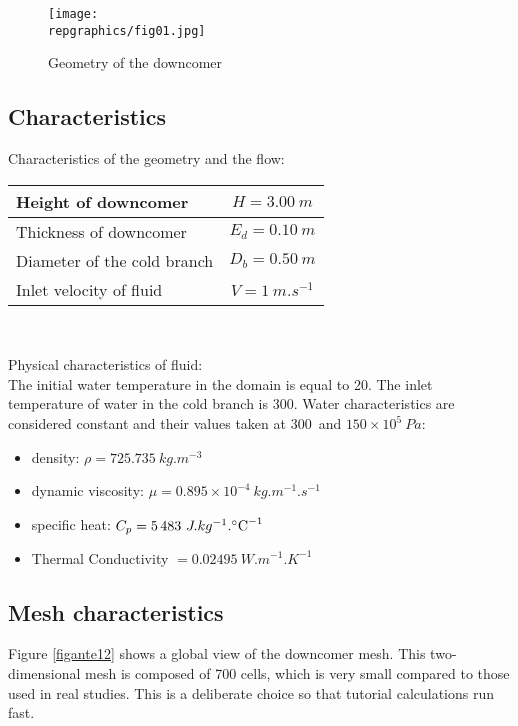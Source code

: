 \begin{figure}[h!]
\begin{center}
\texttt{[image: \\repgraphics/fig01.jpg]} 
\caption{Geometry of the downcomer}
\label{figante11}
\end{center}
\end{figure}

	\subsection{Characteristics}

Characteristics of the geometry and the flow:
\begin{center}
\begin{tabular}{|l|c|}
\hline
Height of downcomer & $H = 3.00\ m$ \\
\hline
Thickness of downcomer & $E_{d} = 0.10\ m$ \\
\hline
Diameter of the cold branch & $D_{b} = 0.50\ m$ \\
\hline
Inlet velocity of fluid & $V = 1\ m.s^{-1}$ \\
\hline
\end{tabular}\\
\end{center}

Physical characteristics of fluid:\\
The initial water temperature in the domain is equal to 20\degresC.
The inlet temperature of water in the cold branch is 300\degresC.
Water characteristics are considered constant and their values taken at
300\degresC\ and $150\times 10^{5}\ Pa$: 
\begin{itemize}
	\item density: $\rho = 725.735\ kg.m^{-3}$ 
	\item dynamic viscosity: $\mu = 0.895\times10^{-4}\ kg.m^{-1}.s^{-1}$
	\item specific heat: $C_{p} = 5\,483\ J.kg^{-1}.\mbox{\degresC}^{-1}$
	\item Thermal Conductivity $ = 0.02495\ W.m^{-1}.K^{-1}$
\end{itemize}


	\subsection{Mesh characteristics}

Figure \ref{figante12} shows a global view of the downcomer mesh. This
two-dimensional mesh is composed 
of 700 cells, which is very small compared to those used in real
studies. This is  
a deliberate choice so that tutorial calculations run fast.

